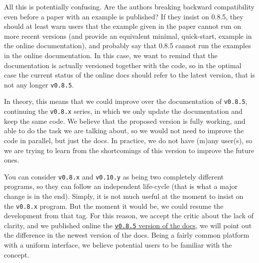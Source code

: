 \documentclass[a4paper,11pt]{article}
\begin{document}
\begin{response}{
  All this is potentially confusing. Are the authors breaking backward compatibility
  even before a paper with an example is published? If they insist on 0.8.5, they
  should at least warn users that the example given in the paper cannot run on more
  recent versions (and provide an equivalent minimal, quick-start, example in the
  online documentation), and probably say that 0.8.5 cannot run the examples in the
  online documentation.
}
In this case, we want to remind that the documentation is actually versioned
together with the code, so in the optimal case the current status of the online
docs should refer to the latest version, that is not any longer \texttt{v0.8.5}.

In theory, this means that we could improve over the documentation of
\texttt{v0.8.5}, continuing the \texttt{v0.8.x} series, in which we only update
the documentation and keep the same code.
We believe that the proposed version is fully working, and able to do the task
we are talking about, so we would not need to improve the code in parallel, but
just the docs.
In practice, we do not have (m)any user(s), so we are trying to learn from the
shortcomings of this version to improve the future ones.

You can consider \texttt{v0.8.x} and \texttt{v0.10.y} as being two completely
different programs, so they can follow an independent life-cycle (that is what
a major change is in the end). Simply, it is not much useful at the moment to
insist on the \texttt{v0.8.x} program. But the moment it would be, we could
resume the development from that tag.
For this reason, we accept the critic about the lack of clarity, and we
published online the
\href{https://eko.readthedocs.io/en/v0.8.5}{\texttt{v0.8.5} version of the
docs}, we will point out the difference in the newest version of the docs.
Being a fairly common platform with a uniform interface, we believe potential
users to be familiar with the concept.
\end{response}
\end{document}
